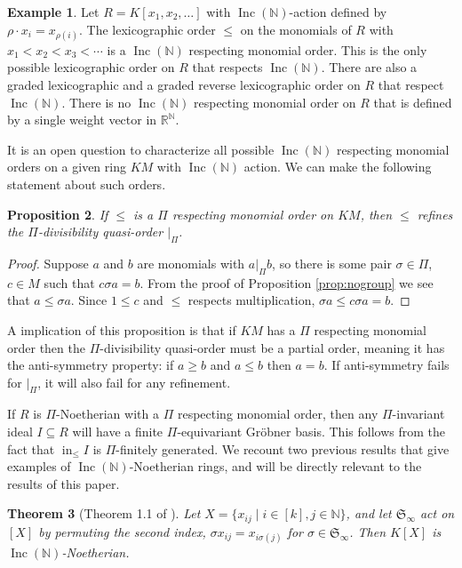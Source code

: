 \documentclass{article}
\theoremstyle{plain}
\newtheorem{theorem}{Theorem}[section]
\newtheorem{proposition}[theorem]{Proposition}
\theoremstyle{definition}
\newtheorem{example}[theorem]{Example}
\numberwithin{equation}{section}
\newcommand{\B}[1]{\mathbb #1}
\newcommand{\F}[1]{\mathfrak #1}
\DeclareMathOperator{\initial}{in}
\newcommand{\Inc}{\operatorname{Inc}(\B N)}
\newcommand{\mon}{M}
\newcommand{\Sym}{\F S_\infty}
\newcommand{\LT}{\initial_{\leq}}
\begin{document}
\begin{example}
 Let $R = K[x_1,x_2,\ldots]$ with $\Inc$-action defined by $\rho \cdot x_i = x_{\rho(i)}$.  The lexicographic order $\leq$ on the monomials of $R$ with $x_1 < x_2 < x_3 < \cdots$ is a $\Inc$ respecting monomial order.  This is the only possible lexicographic order on $R$ that respects $\Inc$.  There are also a graded lexicographic and a graded reverse lexicographic order on $R$ that respect $\Inc$.  There is no $\Inc$ respecting monomial order on $R$ that is defined by a single weight vector in $\B R^{\B N}$.
\end{example}

It is an open question to characterize all possible $\Inc$ respecting monomial orders on a given ring $K\mon$ with $\Inc$ action.  We can make the following statement about such orders.

\begin{proposition}
 If $\leq$ is a $\Pi$ respecting monomial order on $K\mon$, then $\leq$ refines the $\Pi$-divisibility quasi-order $|_\Pi$.
\end{proposition}
\begin{proof}
 Suppose $a$ and $b$ are monomials with $a |_\Pi b$, so there is some pair $\sigma \in \Pi$, $c \in \mon$ such that $c\sigma a = b$.  From the proof of Proposition \ref{prop:nogroup} we see that $a \leq \sigma a$.  Since $1 \leq c$ and $\leq$ respects multiplication, $\sigma a \leq c\sigma a = b$.
\end{proof}

A implication of this proposition is that if $K\mon$ has a $\Pi$ respecting monomial order then the $\Pi$-divisibility quasi-order must be a partial order, meaning it has the anti-symmetry property: if $a \geq b$ and $a \leq b$ then $a = b$.  If anti-symmetry fails for $|_\Pi$, it will also fail for any refinement.

If $R$ is $\Pi$-Noetherian with a $\Pi$ respecting monomial order, then any $\Pi$-invariant ideal $I \subseteq R$ will have a finite $\Pi$-equivariant Gr\"obner basis.  This follows from the fact that $\LT I$ is $\Pi$-finitely generated.  We recount two previous results that give examples of $\Inc$-Noetherian rings, and will be directly relevant to the results of this paper.

\begin{theorem}[Theorem 1.1 of \cite{hillar2012finite}]\label{thm:HS}
 Let $X = \{x_{ij} \mid i \in [k], j \in \B N\}$, and let $\Sym$ act on $[X]$ by permuting the second index, $\sigma x_{ij} = x_{i\sigma(j)}$ for $\sigma \in \Sym$.  Then $K[X]$ is $\Inc$-Noetherian.
\end{theorem}
\end{document}
